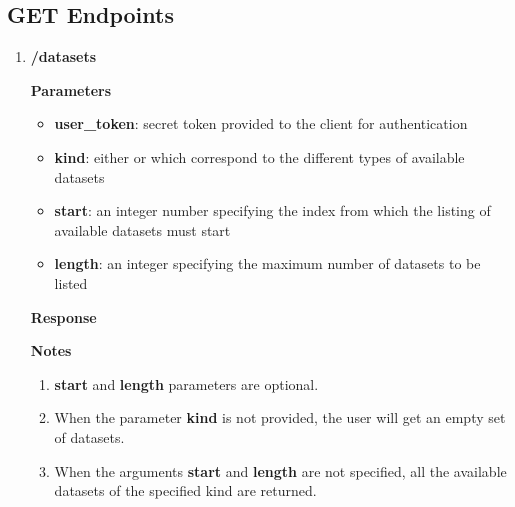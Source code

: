 \documentclass[a4paper,10pt]{scrartcl}
\begin{document}
\subsection{GET Endpoints}
\begin{enumerate}
 \item \textbf{/datasets}
\textbf{Parameters}
\begin{itemize}
\item \textbf{user\_token}: secret token provided to the client for authentication
\item \textbf{kind}: either  or  which correspond to the different types of available datasets
\item \textbf{start}: an integer number specifying the index from which the listing of available datasets must start 
\item \textbf{length}: an integer specifying the maximum number of datasets to be listed
\end{itemize}
\textbf{Response}
\textbf{Notes}
\begin{enumerate}
 \item \textbf{start} and \textbf{length} parameters are optional. 
 \item When the parameter \textbf{kind} is not provided, the user will get an empty 
 set of datasets. 
 \item When the arguments \textbf{start} and \textbf{length} 
 are not specified, all the available datasets of the specified kind are returned.
\end{enumerate}


\end{enumerate}
\end{document}
